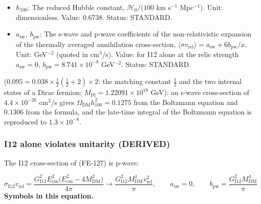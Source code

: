 \documentclass[
  10pt,
]{article}
\begin{document}
\begin{itemize}
  \(\Omega_{\mathrm{DM}}h_{100}^2 = 0.120\) (both species). Status:
  DERIVED.
\item
  \(h_{100}\): The reduced Hubble constant, \(\mathcal{H}_0/(100\) km
  s\(^{-1}\) Mpc\(^{-1})\). Unit: dimensionless. Value: 0.6738. Status:
  STANDARD.
\item
  \(a_{\mathrm{sw}},\ b_{\mathrm{pw}}\): The s-wave and p-wave
  coefficients of the non-relativistic expansion of the thermally
  averaged annihilation cross-section,
  \(\langle\sigma v_{\mathrm{rel}}\rangle = a_{\mathrm{sw}} + 6b_{\mathrm{pw}}/x\).
  Unit: GeV\(^{-2}\) (quoted in cm\(^3\)/s). Value: for I12 alone at the
  relic strength \(a_{\mathrm{sw}} = 0\),
  \(b_{\mathrm{pw}} = 8.741\times10^{-8}\) GeV\(^{-2}\). Status:
  STANDARD.
\end{itemize}

(\(0.095 = 0.038\times\frac12(\frac12 + 2)\times2\): the matching
constant \(\frac12\) and the two internal states of a Dirac fermion;
\(M_{\mathrm{Pl}} = 1.22091\times10^{19}\) GeV): an s-wave cross-section
of \(4.4\times10^{-26}\) cm\(^3\)/s gives
\(\Omega_{\mathrm{DM}}h_{100}^2 = 0.1275\) from the Boltzmann equation
and \(0.1306\) from the formula, and the late-time integral of the
Boltzmann equation is reproduced to \(1.3\times10^{-8}\).

\hypertarget{i12-alone-violates-unitarity-derived}{%
\subsubsection*{I12 alone violates unitarity
(DERIVED)}\label{i12-alone-violates-unitarity-derived}}

The I12 cross-section of (FE-127) is p-wave:

\[ \sigma_{\mathrm{I12}}v_{\mathrm{rel}} = \frac{G_{\mathrm{I12}}^2E_{\mathrm{cm}}^2\big(E_{\mathrm{cm}}^2 - 4M_{\mathrm{DM}}^2\big)}{4\pi} \to \frac{G_{\mathrm{I12}}^2M_{\mathrm{DM}}^4v_{\mathrm{rel}}^2}{\pi},\qquad a_{\mathrm{sw}} = 0,\qquad b_{\mathrm{pw}} = \frac{G_{\mathrm{I12}}^2M_{\mathrm{DM}}^4}{\pi} \]
\textbf{Symbols in this equation.}
\end{document}
